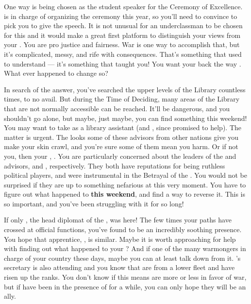 \documentclass[char]{GL2020}
\begin{document}
One way is being chosen as the student speaker for the Ceremony of Excellence. \cMusic{\full} is in charge of organizing the ceremony this year, so you'll need to convince \cMusic{\them} to pick you to give the speech. It is not unusual for an underclassman to be chosen for this and it would make a great first platform to distinguish your views from your \cLoud{\parent}. You are pro justice and fairness. War is one way to accomplish that, but it's complicated, messy, and rife with consequences. That's something that \cLoud{} used to understand — it's something that \cLoud{\they} taught you! You want your \cLoud{\parent} back the way \cLoud{\they} \cLoud{\were}. What ever happened to change \cLoud{\them} so?

In search of the answer, you've searched the upper levels of the Library countless times, to no avail. But during the Time of Deciding, many areas of the Library that are not normally accessible can be reached. It'll be dangerous, and you shouldn't go alone, but maybe, just maybe, you can find something this weekend! You may want to take \cPresident{} as \cPresident{\they} \cPresident{\are} a library assistant (and \cHeir{}, since \cHeir{\they} promised to help). The matter is urgent. The looks some of these advisors from other nations give you make your skin crawl, and you're sure some of them mean you harm. Or if not you, then your \cLoud{\parent}, \cLoud{}. You are particularly concerned about the leaders of the \pTech{} and \pFarm{} advisors, \cDiplomat{\full} and \cEvil{\full}, respectively. They both have reputations for being ruthless political players, and were instrumental in the Betrayal of the \pShip{}. You would not be surprised if they are up to something nefarious at this very moment. You have to figure out what happened to \cLoud{} \textbf{this weekend}, and find a way to reverse it. This is so important, and you've been struggling with it for so long!

If only \cHeadDiplomat{\full}, the head diplomat of the \pShip{}, was here! The few times your paths have crossed at official functions, you've found \cHeadDiplomat{\them} to be an incredibly soothing presence. You hope that \cHeadDiplomat{\their} apprentice, \cJuniorStatesman{\full}, is similar. Maybe it is worth approaching \cJuniorStatesman{\them} for help with finding out what happened to your \cLoud{\parent}? And if \cJuniorStatesman{\they} \cJuniorStatesman{\are} one of the many warmongers in charge of your country these days, maybe you can at least talk \cJuniorStatesman{\them} down from it. \cHeadDiplomat{}’s secretary \cChupLeader{\full} is also attending and you know that \cChupLeader{\they} are from a lower fleet and have risen up the ranks. You don’t know if this means \cChupLeader{\they} are more or less in favor of war, but if \cChupLeader{\they} have been in the presence of \cHeadDiplomat{} for a while, you can only hope they will be an ally.  
\end{document}
